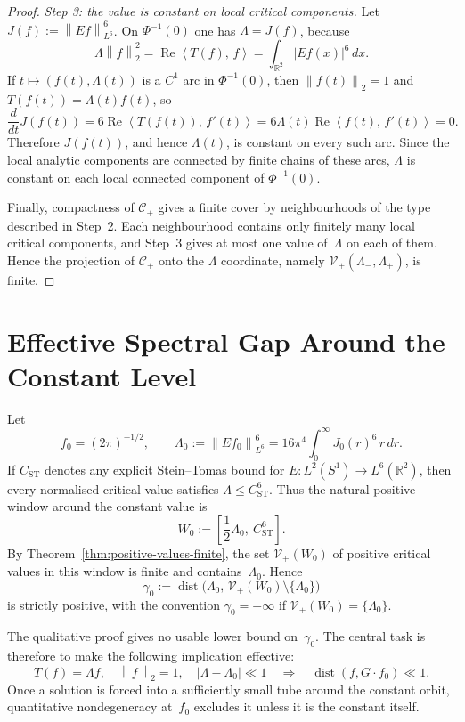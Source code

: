 \documentclass[12pt]{article}
\theoremstyle{definition}
\theoremstyle{remark}
\newcommand{\R}{\mathbb{R}}
\newcommand{\abs}[1]{\left|#1\right|}
\newcommand{\norm}[1]{\left\|#1\right\|}
\newcommand{\ip}[2]{\left\langle #1,\, #2\right\rangle}
\newcommand{\re}{\operatorname{Re}}
\begin{document}
\begin{proof}
  \emph{Step 3: the value is constant on local critical components.}
  Let $J(f):=\norm{Ef}_{L^6}^6$.  On $\Phi^{-1}(0)$ one has
  $\Lambda=J(f)$, because
  \[
    \Lambda\norm{f}_2^2
    =\re\ip{T(f)}{f}
    =\int_{\R^2}|Ef(x)|^6\,dx.
  \]
  If $t\mapsto(f(t),\Lambda(t))$ is a $C^1$ arc in $\Phi^{-1}(0)$, then
  $\norm{f(t)}_2=1$ and $T(f(t))=\Lambda(t)f(t)$, so
  \[
    \frac{d}{dt}J(f(t))
    =6\re\ip{T(f(t))}{f'(t)}
    =6\Lambda(t)\re\ip{f(t)}{f'(t)}
    =0.
  \]
  Therefore $J(f(t))$, and hence $\Lambda(t)$, is constant on every such
  arc.  Since the local analytic components are connected by finite
  chains of these arcs, $\Lambda$ is constant on each local connected
  component of $\Phi^{-1}(0)$.

  Finally, compactness of $\mathcal C_+$ gives a finite cover by
  neighbourhoods of the type described in Step~2.  Each neighbourhood
  contains only finitely many local critical components, and Step~3 gives
  at most one value of~$\Lambda$ on each of them.  Hence the projection
  of $\mathcal C_+$ onto the $\Lambda$ coordinate, namely
  $\mathcal V_+(\Lambda_-,\Lambda_+)$, is finite.
\end{proof}



\section{Effective Spectral Gap Around the Constant Level}
\label{sec:effective-gap}

Let
\[
  f_0=(2\pi)^{-1/2},\qquad
  \Lambda_0:=\norm{Ef_0}_{L^6}^6
  =16\pi^4\int_0^\infty J_0(r)^6\,r\,dr.
\]
If $C_{\mathrm{ST}}$ denotes any explicit Stein--Tomas bound for
$E:L^2(S^1)\to L^6(\R^2)$, then every normalised critical value satisfies
$\Lambda\leq C_{\mathrm{ST}}^6$.  Thus the natural positive window around
the constant value is
\[
  W_0:=\left[\frac12\Lambda_0,\ C_{\mathrm{ST}}^6\right].
\]
By Theorem~\ref{thm:positive-values-finite}, the set
$\mathcal V_+(W_0)$ of positive critical values in this window is finite
and contains~$\Lambda_0$.  Hence
\begin{equation}\label{eq:positive-gap-def}
  \gamma_0
  :=
  \operatorname{dist}\bigl(
    \Lambda_0,\,
    \mathcal V_+(W_0)\setminus\{\Lambda_0\}
  \bigr)
\end{equation}
is strictly positive, with the convention $\gamma_0=+\infty$ if
$\mathcal V_+(W_0)=\{\Lambda_0\}$.

The qualitative proof gives no usable lower bound on~$\gamma_0$.  The
central task is therefore to make the following implication effective:
\[
  T(f)=\Lambda f,\quad \norm f_2=1,\quad
  \abs{\Lambda-\Lambda_0}\ll1
  \quad\Longrightarrow\quad
  \operatorname{dist}(f,G\cdot f_0)\ll1.
\]
Once a solution is forced into a sufficiently small tube around the
constant orbit, quantitative nondegeneracy at~$f_0$ excludes it unless it
is the constant itself.
\end{document}
